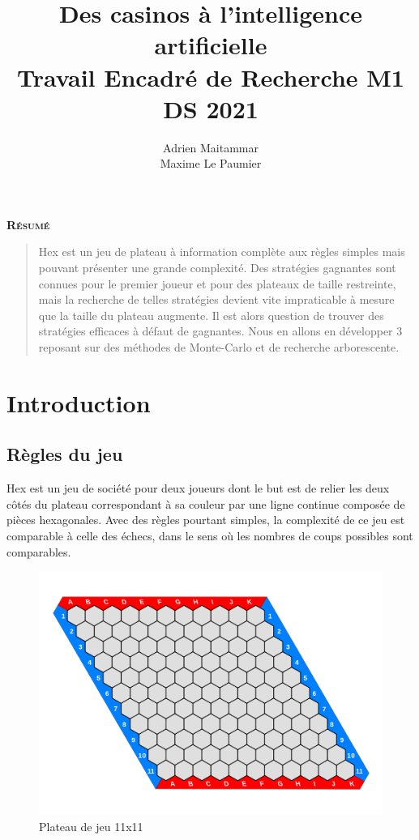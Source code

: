 \documentclass[a4paper]{article}
\title{\huge Des casinos à l'intelligence artificielle\\[15pt] \small Travail Encadré de Recherche M1 DS 2021}
\author{Adrien Maitammar \\ Maxime Le Paumier}
\theoremstyle{definition}
\renewenvironment{abstract}
{
	\centerline
	{\large \bfseries \scshape Résumé}
	\begin{quote}
	}
	{
	\end{quote}
}
\begin{document}
\maketitle

\vspace{40pt}

\begin{abstract}
Hex est un jeu de plateau à information complète aux règles simples mais pouvant présenter une grande complexité. Des stratégies gagnantes sont connues pour le premier joueur et pour des plateaux de taille restreinte, mais la recherche de telles stratégies devient vite impraticable à mesure que la taille du plateau augmente. Il est alors question de trouver des stratégies efficaces à défaut de gagnantes. Nous en allons en développer 3 reposant sur des méthodes de Monte-Carlo et de recherche arborescente. 
\end{abstract}
\newpage

\renewcommand{\contentsname}{Sommaire}
\tableofcontents
 \clearpage
 
 
\section{Introduction}

\subsection{Règles du jeu}

Hex est un jeu de société pour deux joueurs dont le but est de relier les deux côtés du plateau correspondant à sa couleur par une ligne continue composée de pièces hexagonales. Avec des règles pourtant simples, la complexité de ce jeu est comparable à celle des échecs, dans le sens où les nombres de coups possibles sont comparables. 

\begin{figure}[h]
	\centering
	\includegraphics[scale=0.13]{11x11.png}
	\caption{Plateau de jeu 11x11}
\end{figure}
\end{document}
